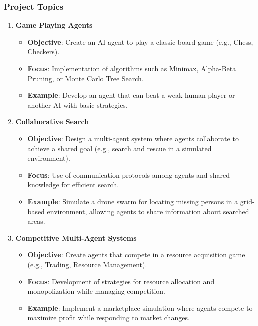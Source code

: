 \documentclass[aspectratio=169]{beamer}
\begin{document}
\begin{frame}[fragile]
    \frametitle{Project Topics}
    \begin{enumerate}
        \item \textbf{Game Playing Agents}
            \begin{itemize}
                \item \textbf{Objective}: Create an AI agent to play a classic board game (e.g., Chess, Checkers).
                \item \textbf{Focus}: Implementation of algorithms such as Minimax, Alpha-Beta Pruning, or Monte Carlo Tree Search.
                \item \textbf{Example}: Develop an agent that can beat a weak human player or another AI with basic strategies.
            \end{itemize}
        
        \item \textbf{Collaborative Search}
            \begin{itemize}
                \item \textbf{Objective}: Design a multi-agent system where agents collaborate to achieve a shared goal (e.g., search and rescue in a simulated environment).
                \item \textbf{Focus}: Use of communication protocols among agents and shared knowledge for efficient search.
                \item \textbf{Example}: Simulate a drone swarm for locating missing persons in a grid-based environment, allowing agents to share information about searched areas.
            \end{itemize}
        
        \item \textbf{Competitive Multi-Agent Systems}
            \begin{itemize}
                \item \textbf{Objective}: Create agents that compete in a resource acquisition game (e.g., Trading, Resource Management).
                \item \textbf{Focus}: Development of strategies for resource allocation and monopolization while managing competition.
                \item \textbf{Example}: Implement a marketplace simulation where agents compete to maximize profit while responding to market changes.
            \end{itemize}
    \end{enumerate}
\end{frame}
\end{document}
